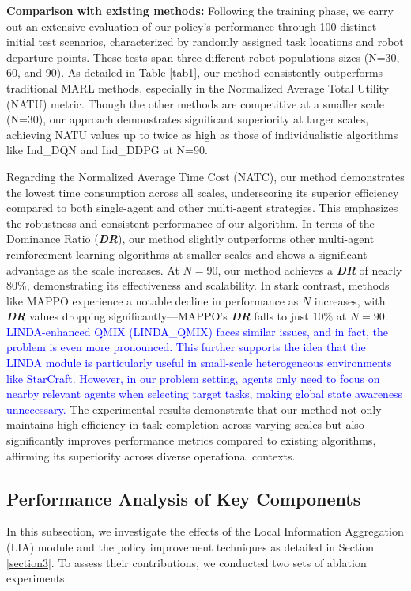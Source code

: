 \documentclass[lettersize,journal]{IEEEtran}
\newcommand{\blue}[1]{\textcolor{blue}{#1}}
\begin{document}
{\bf Comparison with existing methods:} Following the training phase, we carry out an extensive evaluation of our policy's performance through 100 distinct initial test scenarios, characterized by randomly assigned task locations and robot departure points. These tests span three different robot populations sizes (N=30, 60, and 90). As detailed in Table \ref{tab1}, our method consistently outperforms traditional MARL methods, especially in the Normalized Average Total Utility (NATU) metric. Though the other methods are competitive at a smaller scale (N=30), our approach demonstrates significant superiority at larger scales, achieving NATU values up to twice as high as those of individualistic algorithms like Ind\_DQN and Ind\_DDPG at N=90.

Regarding the Normalized Average Time Cost (NATC), our method demonstrates the lowest time consumption across all scales, underscoring its superior efficiency compared to both single-agent and other multi-agent strategies. This emphasizes the robustness and consistent performance of our algorithm. In terms of the Dominance Ratio (\textbf{\textit{DR}}), our method slightly outperforms other multi-agent reinforcement learning algorithms at smaller scales and shows a significant advantage as the scale increases. At $N = 90$, our method achieves a \textbf{\textit{DR}} of nearly 80\%, demonstrating its effectiveness and scalability. In stark contrast, methods like MAPPO experience a notable decline in performance as $N$ increases, with \textbf{\textit{DR}} values dropping significantly—MAPPO’s \textbf{\textit{DR}} falls to just 10\% at $N = 90$. \blue{LINDA-enhanced QMIX (LINDA\_QMIX) faces similar issues, and in fact, the problem is even more pronounced. This further supports the idea that the LINDA module is particularly useful in small-scale heterogeneous environments like StarCraft. However, in our problem setting, agents only need to focus on nearby relevant agents when selecting target tasks, making global state awareness unnecessary.} The experimental results demonstrate that our method not only maintains high efficiency in task completion across varying scales but also significantly improves performance metrics compared to existing algorithms, affirming its superiority across diverse operational contexts.


\subsection{Performance Analysis of Key Components}
In this subsection, we investigate the effects of the Local Information Aggregation (LIA) module and the policy improvement techniques as detailed in Section \ref{section3}. To assess their contributions, we conducted two sets of ablation experiments. 
\end{document}

